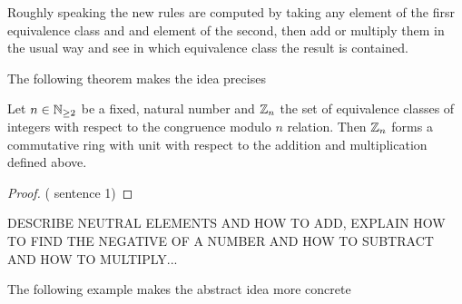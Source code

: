 Roughly speaking the new rules are computed by taking any element of the firsr equivalence class and and element of the second, then add or multiply them in the usual way and see in which equivalence class the result is contained.

The following theorem makes the idea precises
\begin{theorem}
\label{def: residual class ring}
Let $ n \in \mathbb{N} _{\geq 2} $ be a fixed, natural number and
$ \mathbb{Z}_n $ the set of equivalence classes of integers with respect to the  congruence modulo $ n $ relation. Then $ \mathbb{Z}_n $ forms a commutative ring with unit with respect to the addition and multiplication defined above.
\end{theorem}
\begin{proof} (\cite{AL} sentence 1)  
\end{proof}
\begin{remark}
DESCRIBE NEUTRAL ELEMENTS AND HOW TO ADD, EXPLAIN HOW TO FIND THE NEGATIVE OF A NUMBER AND HOW TO SUBTRACT AND HOW TO MULTIPLY...
\end{remark}
The following example makes the abstract idea more concrete
